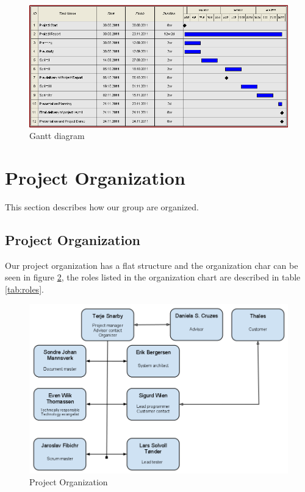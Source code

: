 \begin{figure}[!ht]
\includegraphics[scale=0.48]{./planning/img/gantt.png}
\caption{Gantt diagram}
\label{fig:gantt}
\end{figure}

\section{Project Organization}
This section describes how our group are organized.

\subsection{Project Organization}
Our project organization has a flat structure and the organization char can be seen in figure \ref{fig:orgchart}, the roles listed in the organization chart are described in table \ref{tab:roles}. \newline
\\
\begin{figure}[here]
\includegraphics[scale=0.45]{./planning/img/organization.png}
\caption{Project Organization}
\label{fig:orgchart}
\end{figure}

